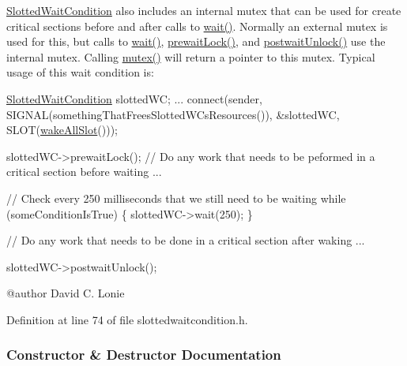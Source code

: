 \hyperlink{classGlobalSearch_1_1SlottedWaitCondition}{Slotted\+Wait\+Condition} also includes an internal mutex that can be used for create critical sections before and after calls to \hyperlink{classGlobalSearch_1_1SlottedWaitCondition_a30999486ab4737cda3c4e93f8625ac1f}{wait()}. Normally an external mutex is used for this, but calls to \hyperlink{classGlobalSearch_1_1SlottedWaitCondition_a30999486ab4737cda3c4e93f8625ac1f}{wait()}, \hyperlink{classGlobalSearch_1_1SlottedWaitCondition_afb1ba4315ffa2de59eaf5045d2a4c09f}{prewait\+Lock()}, and \hyperlink{classGlobalSearch_1_1SlottedWaitCondition_a3c9f9e3ba7eebdc3cc270445385e334c}{postwait\+Unlock()} use the internal mutex. Calling \hyperlink{classGlobalSearch_1_1SlottedWaitCondition_af548d9a604d2ec84083e5c92ca1a3849}{mutex()} will return a pointer to this mutex. Typical usage of this wait condition is\+: 
\begin{DoxyCode}
\hyperlink{classGlobalSearch_1_1SlottedWaitCondition_a4fd4c5343242d8961fd893012ba9f54b}{SlottedWaitCondition} slottedWC;
...
connect(sender, SIGNAL(somethingThatFreesSlottedWCsResources()),
        &slottedWC, SLOT(\hyperlink{classGlobalSearch_1_1SlottedWaitCondition_a4024066fe5db52f2e2c9257fcfbb5320}{wakeAllSlot}()));

slottedWC->prewaitLock();
\textcolor{comment}{// Do any work that needs to be peformed in a critical section before waiting}
...

\textcolor{comment}{// Check every 250 milliseconds that we still need to be waiting}
while (someConditionIsTrue) \{
  slottedWC->wait(250);
\}

\textcolor{comment}{// Do any work that needs to be done in a critical section after waking}
...

slottedWC->postwaitUnlock();
\end{DoxyCode}
 \begin{DoxyVerb} @author David C. Lonie\end{DoxyVerb}
 

Definition at line 74 of file slottedwaitcondition.\+h.



\subsubsection{Constructor \& Destructor Documentation}
\hypertarget{classGlobalSearch_1_1SlottedWaitCondition_a4fd4c5343242d8961fd893012ba9f54b}{}
